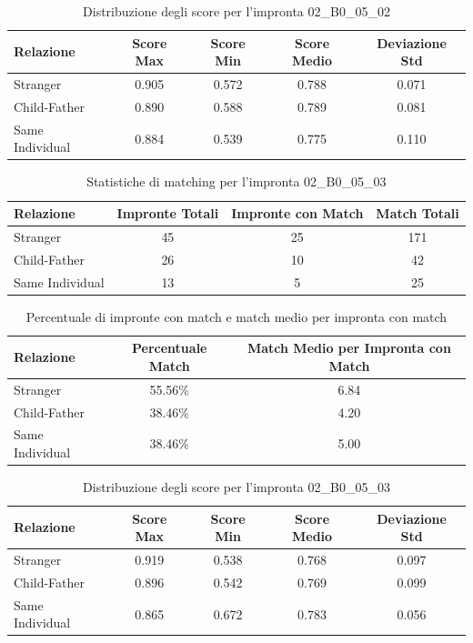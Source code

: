\begin{table}[htbp]
\centering
\caption{Distribuzione degli score per l'impronta 02\_B0\_05\_02}
\label{tab:scores_02_B0_05_02}
\begin{tabular}{|l|c|c|c|c|}
\hline
\textbf{Relazione} & \textbf{Score Max} & \textbf{Score Min} & \textbf{Score Medio} & \textbf{Deviazione Std} \\
\hline
Stranger & 0.905 & 0.572 & 0.788 & 0.071 \\
\hline
Child-Father & 0.890 & 0.588 & 0.789 & 0.081 \\
\hline
Same Individual & 0.884 & 0.539 & 0.775 & 0.110 \\
\hline
\end{tabular}
\end{table}


\begin{table}[htbp]
\centering
\caption{Statistiche di matching per l'impronta 02\_B0\_05\_03}
\label{tab:results_02_B0_05_03}
\begin{tabular}{|l|c|c|c|}
\hline
\textbf{Relazione} & \textbf{Impronte Totali} & \textbf{Impronte con Match} & \textbf{Match Totali} \\
\hline
Stranger & 45 & 25 & 171 \\
\hline
Child-Father & 26 & 10 & 42 \\
\hline
Same Individual & 13 & 5 & 25 \\
\hline
\end{tabular}
\end{table}


\begin{table}[htbp]
\centering
\caption{Percentuale di impronte con match e match medio per impronta con match}
\label{tab:match_percentage_02_B0_05_03}
\begin{tabular}{|l|c|c|}
\hline
\textbf{Relazione} & \textbf{Percentuale Match} & \textbf{Match Medio per Impronta con Match} \\
\hline
Stranger & 55.56\% & 6.84 \\
\hline
Child-Father & 38.46\% & 4.20 \\
\hline
Same Individual & 38.46\% & 5.00 \\
\hline
\end{tabular}
\end{table}


\begin{table}[htbp]
\centering
\caption{Distribuzione degli score per l'impronta 02\_B0\_05\_03}
\label{tab:scores_02_B0_05_03}
\begin{tabular}{|l|c|c|c|c|}
\hline
\textbf{Relazione} & \textbf{Score Max} & \textbf{Score Min} & \textbf{Score Medio} & \textbf{Deviazione Std} \\
\hline
Stranger & 0.919 & 0.538 & 0.768 & 0.097 \\
\hline
Child-Father & 0.896 & 0.542 & 0.769 & 0.099 \\
\hline
Same Individual & 0.865 & 0.672 & 0.783 & 0.056 \\
\hline
\end{tabular}
\end{table}


